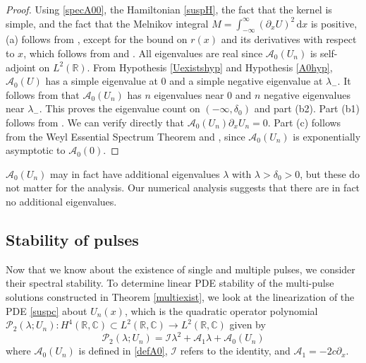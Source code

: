 \documentclass[review,onefignum,onetabnum]{siamart171218}
\newcommand{\C}{\mathbb{C}}
\newcommand{\R}{\mathbb{R}}
\newcommand{\rmd}{\mathrm{d}}
\newcommand{\calA}{\mathcal{A}}
\newcommand{\calI}{\mathcal{I}}
\newcommand{\calP}{\mathcal{P}}
\begin{document}
\begin{proof}
Using \cref{specA00}, the Hamiltonian \cref{suspH}, the fact that the kernel is simple,
and the fact that the Melnikov integral $M = \int_{-\infty}^\infty (\partial_x U)^2\,\rmd x$ is positive, (a) follows from \cite[Theorem~3.6]{sandstede:iol97}, except for the bound on $r(x)$ and its derivatives with respect to $x$, which follows from \cite{Sanstede1993} and \cite{sandstede:som98}. All eigenvalues are real since $\calA_0(U_n)$ is self-adjoint on $L^2(\R)$.  From Hypothesis \ref{Uexistshyp} and Hypothesis \ref{A0hyp}, $\calA_0(U)$ has a simple eigenvalue at 0 and a simple negative eigenvalue at $\lambda_-$. It follows from \cite{alexander:ati90} that $\calA_0(U_n)$ has $n$ eigenvalues near 0 and $n$ negative eigenvalues near $\lambda_-$. This proves the eigenvalue count on $(-\infty, \delta_0)$ and part (b2). Part (b1) follows from \cite{sandstede:som98}. We can verify directly that $\calA_0(U_n)\partial_x U_n = 0$. Part (c) follows from the Weyl Essential Spectrum Theorem \cite[Theorem~2.2.6]{kapitula:sad13} and \cite[Theorem~3.1.11]{kapitula:sad13}, since $\calA_0(U_n)$ is exponentially asymptotic to $\calA_0(0)$.
\end{proof}

\begin{remark}$\calA_0(U_n)$ may in fact have additional eigenvalues $\lambda$ with $\lambda > \delta_0 > 0$, but these do not matter for the analysis. Our numerical analysis suggests that there are in fact no additional eigenvalues.
\end{remark}

\subsection{Stability of pulses}

Now that we know about the existence of single and multiple pulses, we consider their spectral stability. To determine linear PDE stability of the multi-pulse solutions constructed in Theorem \ref{multiexist}, we look at the linearization of the PDE \cref{suspc} about $U_n(x)$, which is the quadratic operator polynomial $\calP_2(\lambda; U_n): H^4(\R, \C) \subset L^2(\R,\C) \rightarrow L^2(\R,\C)$ given by
\begin{equation}\label{quadeig}
\calP_2(\lambda; U_n) = \calI \lambda^2 + \calA_1 \lambda + \calA_0(U_n)
\end{equation}
where $\calA_0(U_n)$ is defined in \cref{defA0}, $\calI$ refers to the identity, and $\calA_1=-2 c \partial_x$.
\end{document}
